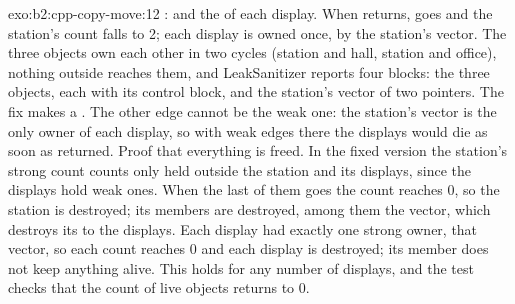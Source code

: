 \begin{solution}{exo:b2:cpp-copy-move:12}
:  and the  of each display. When  returns,  goes and
the station's count falls to 2; each display is owned once, by the station's vector. The three objects own each
other in two cycles (station and hall, station and office), nothing outside reaches them, and LeakSanitizer reports
four blocks: the three objects, each with its control block, and the station's vector of two pointers. The fix makes  a . The other edge cannot be the weak
one: the station's vector is the only owner of each display, so with weak edges there the displays would die as soon
as  returned.
Proof that everything is freed. In the fixed version the station's strong count counts only  held
outside the station and its displays, since the displays hold weak ones. When the last of them goes the count reaches
0, so the station is destroyed; its members are destroyed, among them the vector, which destroys its 
to the displays. Each display had exactly one strong owner, that vector, so each count reaches 0 and each display is
destroyed; its  member does not keep anything alive. This holds for any number of displays, and the
test checks that the count of live objects returns to 0.
\end{solution}

